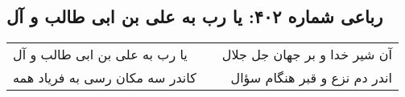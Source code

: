 \begin{center}
\section*{رباعی شماره ۴۰۲: یا رب به علی بن ابی طالب و آل}
\label{sec:sh402}
\begin{longtable}{l p{0.5cm} r}
یا رب به علی بن ابی طالب و آل
&&
آن شیر خدا و بر جهان جل جلال
\\
کاندر سه مکان رسی به فریاد همه
&&
اندر دم نزع و قبر هنگام سؤال
\\
\end{longtable}
\end{center}
